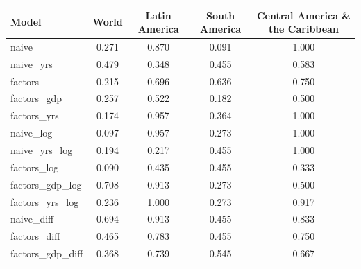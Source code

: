 \begin{tabular}{l*{4}{c}}
\toprule
Model & World & Latin America & South America & Central America \& the Caribbean \\
\midrule
naive & 0.271 & 0.870 & 0.091 & 1.000 \\
naive\_yrs & 0.479 & 0.348 & 0.455 & 0.583 \\
factors & 0.215 & 0.696 & 0.636 & 0.750 \\
factors\_gdp & 0.257 & 0.522 & 0.182 & 0.500 \\
factors\_yrs & 0.174 & 0.957 & 0.364 & 1.000 \\
naive\_log & 0.097 & 0.957 & 0.273 & 1.000 \\
naive\_yrs\_log & 0.194 & 0.217 & 0.455 & 1.000 \\
factors\_log & 0.090 & 0.435 & 0.455 & 0.333 \\
factors\_gdp\_log & 0.708 & 0.913 & 0.273 & 0.500 \\
factors\_yrs\_log & 0.236 & 1.000 & 0.273 & 0.917 \\
naive\_diff & 0.694 & 0.913 & 0.455 & 0.833 \\
factors\_diff & 0.465 & 0.783 & 0.455 & 0.750 \\
factors\_gdp\_diff & 0.368 & 0.739 & 0.545 & 0.667 \\
\bottomrule
\end{tabular}
